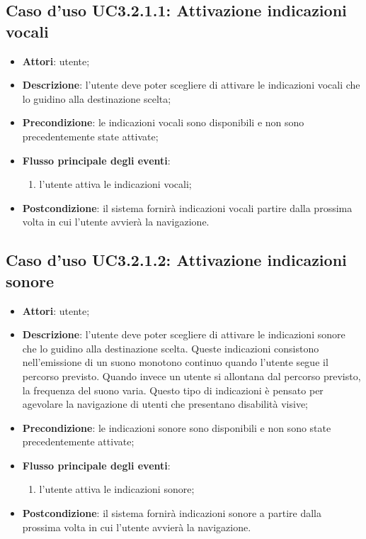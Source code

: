 \documentclass[../AnalisiDeiRequisiti.tex]{subfiles}
\begin{document}
\subsection{Caso d'uso UC3.2.1.1: Attivazione indicazioni vocali}
\begin{itemize}
\item \textbf{Attori}: utente;
\item \textbf{Descrizione}: l'utente deve poter scegliere di attivare le indicazioni vocali che lo guidino alla destinazione scelta; 
      \item \textbf{Precondizione}: le indicazioni vocali sono disponibili e non sono precedentemente state attivate;

        \item \textbf{Flusso principale degli eventi}:
          \begin{enumerate}
          \item l'utente attiva le indicazioni vocali;

      \end{enumerate}
    \item \textbf{Postcondizione}: il sistema fornirà indicazioni vocali partire dalla prossima volta in cui l'utente avvierà la navigazione.
  \end{itemize}
\hypertarget{UC3.2.1.2}{}
\subsection{Caso d'uso UC3.2.1.2: Attivazione indicazioni sonore}
\begin{itemize}
\item \textbf{Attori}: utente;
\item \textbf{Descrizione}: l'utente deve poter scegliere di attivare le indicazioni sonore che lo guidino alla destinazione scelta. Queste indicazioni consistono nell'emissione di un suono monotono continuo quando l'utente segue il percorso previsto. Quando invece un utente si allontana dal percorso previsto, la frequenza del suono varia. Questo tipo di indicazioni è pensato per agevolare la navigazione di utenti che presentano disabilità visive; 
      \item \textbf{Precondizione}: le indicazioni sonore sono disponibili e non sono state precedentemente attivate;

        \item \textbf{Flusso principale degli eventi}:
          \begin{enumerate}
          \item l'utente attiva le indicazioni sonore;
      \end{enumerate}
    \item \textbf{Postcondizione}: il sistema fornirà indicazioni sonore a partire dalla prossima volta in cui l'utente avvierà la navigazione.
  \end{itemize}
\hypertarget{UC3.2.1.3}{}
\end{document}
